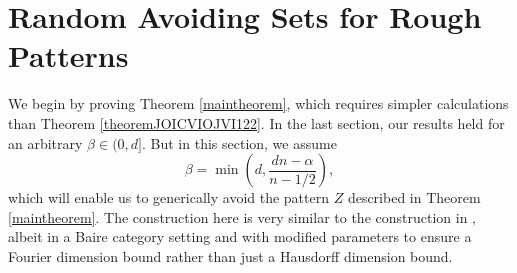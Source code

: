 \documentclass[12pt,reqno]{article}
\numberwithin{equation}{section}
\numberwithin{theorem}{section}
\begin{document}
\section{Random Avoiding Sets for Rough Patterns}

We begin by proving Theorem \ref{maintheorem}, which requires simpler calculations than Theorem \ref{theoremJOICVIOJVI122}. In the last section, our results held for an arbitrary $\beta \in (0,d]$. But in this section, we assume
%
\[ \beta = \min \left( d, \frac{dn - \alpha}{n - 1/2} \right), \]
%
which will enable us to generically avoid the pattern $Z$ described in Theorem \ref{maintheorem}. The construction here is very similar to the construction in \cite{OurPaper}, albeit in a Baire category setting and with modified parameters to ensure a Fourier dimension bound rather than just a Hausdorff dimension bound.
\end{document}
